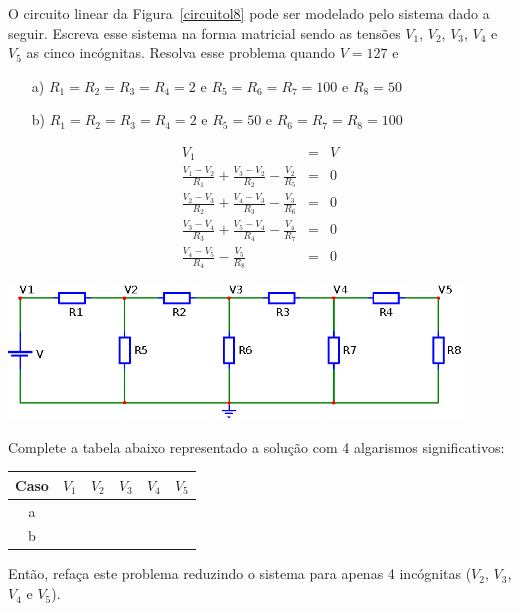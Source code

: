 \begin{exer}\label{prob_circuito_resistores}
O circuito linear da Figura~\ref{circuitol8} pode ser modelado pelo sistema dado a seguir. Escreva esse sistema na forma matricial sendo as tensões $V_1$, $V_2$, $V_3$, $V_4$ e $V_5$ as cinco incógnitas. Resolva esse problema quando $V=127$ e
\begin{itemize}
\item[a)] $R_1=R_2=R_3=R_4=2$ e $R_5=R_6=R_7=100$ e $R_8=50$
\item[b)] $R_1=R_2=R_3=R_4=2$ e $R_5=50$ e $R_6=R_7=R_8=100$
\end{itemize}

\begin{eqnarray*}
V_1&=&V\\
\frac{V_1-V_2}{R_1}+\frac{V_3-V_2}{R_2}-\frac{V_2}{R_5}&=&0\\
\frac{V_2-V_3}{R_2}+\frac{V_4-V_3}{R_3}-\frac{V_3}{R_6}&=&0\\
\frac{V_3-V_4}{R_3}+\frac{V_5-V_4}{R_4}-\frac{V_4}{R_7}&=&0\\
\frac{V_4-V_5}{R_4}-\frac{V_5}{R_8}&=&0
\end{eqnarray*}

\begin{center}
\includegraphics[width=12cm,angle=0]{./cap_linsis/pics/circuito_linear_8.eps}\label{circuitol8}
\end{center}

Complete a tabela abaixo representado a solução com 4 algarismos significativos:

\begin{center}
\begin{tabular}{|c|c|c|c|c|c|}
\hline
Caso & $V_1$ & $V_2$ & $V_3$ & $V_4$ & $V_5$\\
\hline
a & ~\hspace{40pt}~& ~\hspace{40pt}~& ~\hspace{40pt}~& ~\hspace{40pt}~& ~\hspace{40pt}~\\
\hline
b & & & & & \\
\hline
\end{tabular}
\end{center}

Então, refaça este problema reduzindo o sistema para apenas 4 incógnitas ($V_2$, $V_3$, $V_4$ e $V_5$).
\end{exer}
